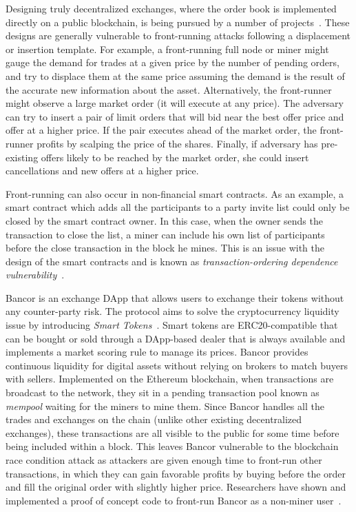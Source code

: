 Designing truly decentralized exchanges, where the order book is implemented directly on a public blockchain, is being pursued by a number of projects~\cite{inDEXgithub,eskandari2017feasibility}. These designs are generally vulnerable to front-running attacks following a displacement or insertion template. For example, a front-running full node or miner might gauge the demand for trades at a given price by the number of pending orders, and try to displace them at the same price assuming the demand is the result of the accurate new information about the asset. Alternatively,  the front-runner might observe a large market order (\ie it will execute at any price). The adversary can try to insert a pair of limit orders that will bid near the best offer price and offer at a higher price. If the pair executes ahead of the market order, the front-runner profits by scalping the price of the shares. Finally, if adversary has pre-existing offers likely to be reached by the market order, she could insert cancellations and new offers at a higher price.


Front-running can also occur in non-financial smart contracts. As an example, a smart contract which adds all the participants to a party invite list could only be closed by the smart contract owner. In this case, when the owner sends the transaction to close the list, a miner can include his own list of participants before the close transaction in the block he mines. This is an issue with the design of the smart contracts and is known as \textit{transaction-ordering dependence vulnerability}~\cite{luu2016making}.

Bancor is an exchange DApp that allows users to exchange their tokens without any counter-party risk. The protocol aims to solve the cryptocurrency liquidity issue by introducing \textit{Smart Tokens}~\cite{hertzog2017bancor}. Smart tokens are ERC20-compatible that can be bought or sold through a DApp-based dealer that is always available and implements a market scoring rule to manage its prices. Bancor provides continuous liquidity for digital assets without relying on brokers to match buyers with sellers. Implemented on the Ethereum blockchain, when transactions are broadcast to the network, they sit in a pending transaction pool known as \textit{mempool} waiting for the miners to mine them. Since Bancor handles all the trades and exchanges on the chain (unlike other existing decentralized exchanges), these transactions are all visible to the public for some time before being included within a block. This leaves Bancor vulnerable to the blockchain race condition attack as attackers are given enough time to front-run other transactions, in which they can gain favorable profits by buying before the order and fill the original order with slightly higher price. Researchers have shown and implemented a proof of concept code to front-run Bancor as a non-miner user~\cite{NewTab13:online}.


